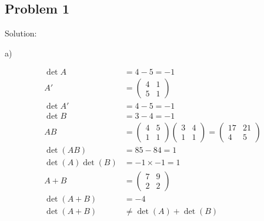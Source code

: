 \documentclass[letterpaper, 11pt]{article}
\newcommand{\1}{\mathds{1}}	%
\theoremstyle{definition}
\begin{document}
\subsection*{Problem 1}

Solution:

a)

\begin{align*}
    \det A            & = 4- 5 = -1                                    \\
    A'                & = \begin{pmatrix}
                              4 & 1 \\
                              5 & 1
                          \end{pmatrix}                               \\
    \det A'           & = 4 - 5 = -1                                   \\
    \det B            & = 3 - 4 = -1                                   \\
    AB                & = \begin{pmatrix}
                              4 & 5 \\
                              1 & 1
                          \end{pmatrix} \begin{pmatrix}
                                            3 & 4 \\
                                            1 & 1
                                        \end{pmatrix} = \begin{pmatrix}
                                                            17 & 21 \\
                                                            4  & 5
                                                        \end{pmatrix} \\
    \det (AB)         & = 85 - 84 = 1                                  \\
    \det (A) \det (B) & = -1 \times -1 = 1                             \\
    A + B             & = \begin{pmatrix}
                              7 & 9 \\
                              2 & 2
                          \end{pmatrix}                               \\
    \det (A+B)        & = -4                                           \\
    \det (A+B)        & \neq \det (A) + \det (B)
\end{align*}
\end{document}
